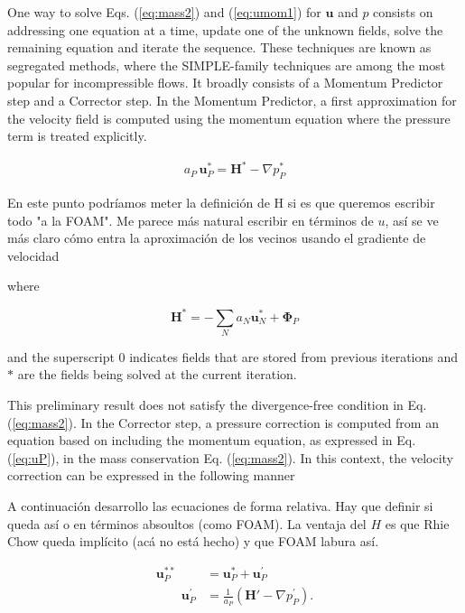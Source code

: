 \documentclass[final,3p,times,10pt,onecolumn]{myElsarticle}
\numberwithin{equation}{section}
\newcommand{\CIP}[1]{{\color{blue} #1}}
\begin{document}
One way to solve Eqs. (\ref{eq:mass2}) and (\ref{eq:umom1}) for $\boldsymbol{u}$ and $p$ consists on addressing one equation at a time, update one of the unknown fields, solve the remaining equation and iterate the sequence. These techniques are known as segregated methods, where the SIMPLE-family techniques \cite{patankar1972,patankar1980,patankar1981,vanDoormal,issa} are among the most popular for incompressible flows. It broadly consists of a Momentum Predictor step and a Corrector step. In the Momentum Predictor, a first approximation for the velocity field is computed using the momentum equation where the pressure term is treated explicitly. 
{\color{red}
\begin{equation} \label{eq:MOMPRED}
\begin{split}
a_P\, \boldsymbol{u}_P^{*} = \boldsymbol{H}^* - \nabla p_P^{*}%
\end{split}
\end{equation}

\CIP{En este punto podríamos meter la definición de H si es que queremos escribir todo "a la FOAM". Me parece más natural escribir en términos de $u$, así se ve más claro cómo entra la aproximación de los vecinos usando el gradiente de velocidad}

\noindent where 

\begin{equation}
\boldsymbol{H}^* = - \sum_N a_N \boldsymbol{u}_N^* + \boldsymbol{\Phi}_P    
\end{equation}

\noindent and the superscript $0$ indicates fields that are stored from previous iterations and $*$ are the fields being solved at the current iteration. }
This preliminary result does not satisfy the divergence-free condition in Eq. (\ref{eq:mass2}). In the Corrector step, a pressure correction is computed from an equation based on including the momentum equation, as expressed in Eq. (\ref{eq:uP}), in the mass conservation  Eq. (\ref{eq:mass2}). In this context, the velocity correction can be expressed in the following manner

\CIP{A continuación desarrollo las ecuaciones de forma relativa. Hay que definir si queda así o en términos absoultos (como FOAM). La ventaja del $H$ es que Rhie Chow queda implícito (acá no está hecho) y que FOAM labura así.}

\begin{align}\label{eq:uprimeDef}
\boldsymbol{u}_P^{**} &= \boldsymbol{u}_P^{*} + \boldsymbol{u}_P^{'} \\
\qquad \boldsymbol{u}_P^{'} &= \frac{1}{a_P}\left(\boldsymbol{H}'- \nabla p_P^{'}\right).
\end{align}
\end{document}
